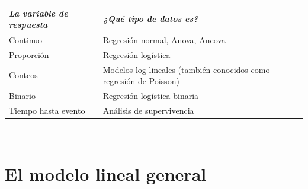 \documentclass[]{book}
\begin{document}
\begin{longtable}[]{@{}ll@{}}
\toprule
\begin{minipage}[b]{0.36\columnwidth}\raggedright\strut
\emph{La variable de respuesta}\strut
\end{minipage} & \begin{minipage}[b]{0.59\columnwidth}\raggedright\strut
\emph{¿Qué tipo de datos es?}\strut
\end{minipage}\tabularnewline
\midrule
\endhead
\begin{minipage}[t]{0.36\columnwidth}\raggedright\strut
Continuo\strut
\end{minipage} & \begin{minipage}[t]{0.59\columnwidth}\raggedright\strut
Regresión normal, Anova, Ancova\strut
\end{minipage}\tabularnewline
\begin{minipage}[t]{0.36\columnwidth}\raggedright\strut
Proporción\strut
\end{minipage} & \begin{minipage}[t]{0.59\columnwidth}\raggedright\strut
Regresión logística\strut
\end{minipage}\tabularnewline
\begin{minipage}[t]{0.36\columnwidth}\raggedright\strut
Conteos\strut
\end{minipage} & \begin{minipage}[t]{0.59\columnwidth}\raggedright\strut
Modelos log-lineales (también conocidos como regresión de Poisson)\strut
\end{minipage}\tabularnewline
\begin{minipage}[t]{0.36\columnwidth}\raggedright\strut
Binario\strut
\end{minipage} & \begin{minipage}[t]{0.59\columnwidth}\raggedright\strut
Regresión logística binaria\strut
\end{minipage}\tabularnewline
\begin{minipage}[t]{0.36\columnwidth}\raggedright\strut
Tiempo hasta evento\strut
\end{minipage} & \begin{minipage}[t]{0.59\columnwidth}\raggedright\strut
Análisis de supervivencia\strut
\end{minipage}\tabularnewline
\bottomrule
\end{longtable}

~

\section{El modelo lineal general}\label{el-modelo-lineal-general}
\end{document}
